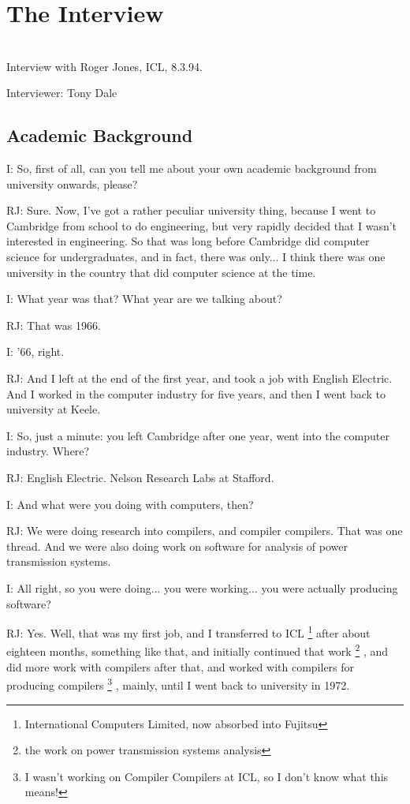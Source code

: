\documentclass[10pt,titlepage]{book}
\begin{document}
\chapter{The Interview}

\ \\

Interview with Roger Jones, ICL, 8.3.94.

Interviewer: Tony Dale 

\section{Academic Background} 

I: So, first of all, can you tell me about your own academic background from university onwards, please?

RJ: Sure. Now, I've got a rather peculiar university thing, because I went to Cambridge from school to do engineering, but very rapidly decided that I wasn't interested in engineering. So that was long before Cambridge did computer science for undergraduates, and in fact, there was only... I think there was one university in the country that did computer science at the time.

I: What year was that? What year are we talking about?

RJ: That was 1966.

I: '66, right.

RJ: And I left at the end of the first year, and took a job with English Electric. And I worked in the computer industry for five years, and then I went back to university at Keele.

I: So, just a minute: you left Cambridge after one year, went into the computer industry. Where?

RJ: English Electric. Nelson Research Labs at Stafford.

I: And what were you doing with computers, then?

RJ: We were doing research into compilers, and compiler compilers. That was one thread. And we were also doing work on software for analysis of power transmission systems.

I: All right, so you were doing... you were working... you were actually producing software?

RJ: Yes. Well, that was my first job, and I transferred to ICL%
\footnote{
International Computers Limited, now absorbed into Fujitsu}%
after about eighteen months, something like that, and initially continued that work%
\footnote{
the work on power transmission systems analysis}%
, and did more work with compilers after that, and worked with compilers for producing compilers%
\footnote{
I wasn't working on Compiler Compilers at ICL, so I don't know what this means!}%
, mainly, until I went back to university in 1972.
\end{document}

